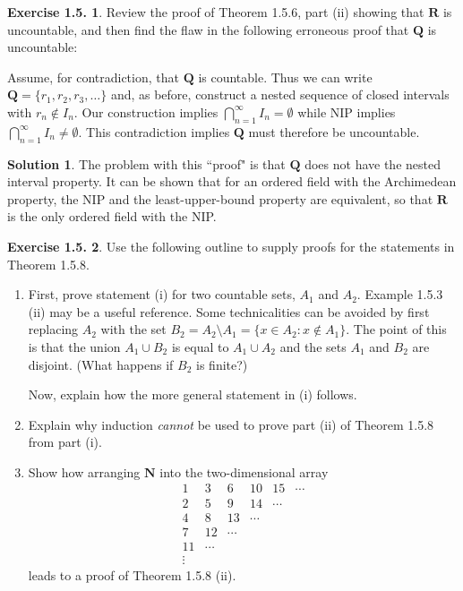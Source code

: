 \documentclass[12pt]{article}
\theoremstyle{definition}
\theoremstyle{exercise}
\newtheorem{exercise}{Exercise 1.5.}
\theoremstyle{solution}
\newtheorem*{solution}{Solution}
\newcommand{\N}{\mathbf{N}}
\newcommand{\Q}{\mathbf{Q}}
\newcommand{\R}{\mathbf{R}}
\begin{document}
\begin{exercise}
\label{ex:2}
    Review the proof of Theorem 1.5.6, part (ii) showing that \( \R \) is uncountable, and then find the flaw in the following erroneous proof that \( \Q \) is uncountable:

    Assume, for contradiction, that \( \Q \) is countable. Thus we can write \( \Q = \{ r_1, r_2, r_3, \ldots \} \) and, as before, construct a nested sequence of closed intervals with \( r_n \not\in I_n \). Our construction implies \( \bigcap_{n=1}^{\infty} I_n = \emptyset \) while NIP implies \( \bigcap_{n=1}^{\infty} I_n \neq \emptyset \). This contradiction implies \( \Q \) must therefore be uncountable.
\end{exercise}

\begin{solution}
    The problem with this ``proof" is that \( \Q \) does not have the nested interval property. It can be shown that for an ordered field with the Archimedean property, the NIP and the least-upper-bound property are equivalent, so that \( \R \) is the only ordered field with the NIP.
\end{solution}

\begin{exercise}
\label{ex:3}
    Use the following outline to supply proofs for the statements in Theorem 1.5.8.
    \begin{enumerate}
        \item First, prove statement (i) for two countable sets, \( A_1 \) and \( A_2 \). Example 1.5.3 (ii) may be a useful reference. Some technicalities can be avoided by first replacing \( A_2 \) with the set \( B_2 = A_2 \setminus A_1 = \{ x \in A_2 : x \not\in A_1 \} \). The point of this is that the union \( A_1 \cup B_2 \) is equal to \( A_1 \cup A_2 \) and the sets \( A_1 \) and \( B_2 \) are disjoint. (What happens if \( B_2 \) is finite?)

        Now, explain how the more general statement in (i) follows.

        \item Explain why induction \textit{cannot} be used to prove part (ii) of Theorem 1.5.8 from part (i).

        \item Show how arranging \( \N \) into the two-dimensional array
        \[
            \begin{matrix}
            1 & 3 & 6 & 10 & 15 & \cdots \\
            2 & 5 & 9 & 14 & \cdots &  \\
            4 & 8 & 13 & \cdots &  &  \\
            7 & 12 & \cdots &   &  &  \\
            11 & \cdots &  &  &  &  \\
            \vdots &  &  &  &  & 
            \end{matrix}
        \]
        leads to a proof of Theorem 1.5.8 (ii).
    \end{enumerate}
\end{exercise}
\end{document}
